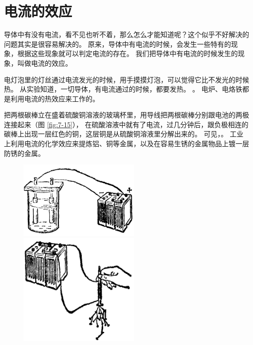\section{电流的效应}\label{sec:7-6}

导体中有没有电流，看不见也听不着，那么怎么才能知道呢？这个似乎不好解决的问题其实是很容易解决的。
原来，导体中有电流的时候，会发生一些特有的现象，根据这些现象就可以判定电流的存在。
我们把导体中有电流的时候发生的现象，叫做电流的效应。

电灯泡里的灯丝通过电流发光的时候，用手摸摸灯泡，可以觉得它比不发光的时候热。
从实验知道，一切导体，有电流通过的时候，都要发热。
。
电炉、电烙铁都是利用电流的热效应来工作的。

把两根碳棒立在盛着硫酸铜溶液的玻璃杯里，用导线把两根碳棒分别跟电池的两极连接起来（图 \ref{fig:7-15}），
在硫酸溶液中就有了电流，过几分钟后，跟负极相连的碳棒上出现一层红色的铜，这层铜是从硫酸铜溶液里分解出来的。
可见，。
工业上利用电流的化学效应来提炼铝、铜等金属，以及在容易生锈的金属物品上镀一层防锈的金属。

\begin{figure}[htbp]
    \centering
    \begin{minipage}{7cm}
    \centering
    \includegraphics[width=6cm]{../pic/czwl2-ch7-15}
    \caption{}\label{fig:7-15}
    \end{minipage}
    \qquad
    \begin{minipage}{7cm}
    \centering
    \includegraphics[width=6cm]{../pic/czwl2-ch7-16}
    \caption{}\label{fig:7-16}
    \end{minipage}
\end{figure}

